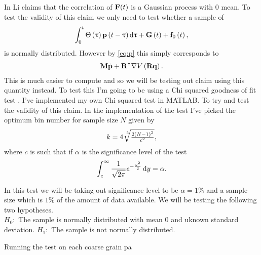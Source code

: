 In \citep{Li2010} Li claims that the correlation of $\mathbf{F}(t)$ is a Gaussian process with 0 mean. To test the validity of this claim we only need to test whether a sample of \begin{align*}
\int_{0}^{t} \Theta\left(\uptau\right)\mathbf{p}\left(t-\uptau\right) \mathop{}\!\mathrm{d} \uptau +\mathbf{G}\left(t\right) + \mathbf{f}_0\left(t\right),
\end{align*}
is normally distributed. However by \eqref{eq:p} this simply corresponds to
\begin{align*}
\mathbf{M}\dot{\mathbf{p}}+\mathbf{R}^{\intercal}\nabla V\left(\mathbf{R}\mathbf{q}\right). 
\end{align*}
This is much easier to compute and so we will be testing out claim using this quantity instead.
To test this I'm going to be using a Chi squared goodness of fit test \cite{Taeger2014}. I've implemented my own Chi squared test in MATLAB. To try and test the validity of this claim. In the implementation of the test I've picked the optimum bin number\cite{Hald2006}\cite{Jr.1950} for sample size $N$ given by 
\begin{align*}
k = 4 \sqrt[\leftroot{-3}\uproot{3}5]{\tfrac{2\left(N-1\right)^2}{c^2}},
\end{align*}
where $c$ is such that if $\alpha$ is the significance level of the test 
\begin{align*}
\int_{c}^{\infty} \frac{1}{\sqrt{2\pi}} e^{-\frac{y^{2}}{2}} \mathop{}\!\mathrm{d} y = \alpha.
\end{align*}

In this test we will be taking out significance level to be $\alpha=1\%$ and a sample size which is $1\%$ of the amount of data available. We will be testing the following two hypotheses.\\

\textbf{$H_0\colon$} The sample is normally distributed with mean 0 and uknown standard deviation.
\textbf{$H_1\colon$} The sample is not normally distributed.

Running the test on each coarse grain pa